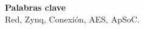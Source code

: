 \begin{center}
	\bigskip
	\bigskip
	\textbf{\huge {Palabras clave}}\\
	\bigskip
	Red, Zynq, Conexión, AES, ApSoC.
\end{center}